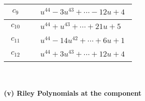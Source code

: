 \documentclass[1p]{elsarticle_modified}
\theoremstyle{definition}
\begin{document}
\begin{tabular}{m{50pt}|m{274pt}}
\hline $$\begin{aligned}c_{9}\end{aligned}$$&$\begin{aligned}
&u^{44}-3 u^{43}+\cdots-12 u+4
\end{aligned}$\\
\hline $$\begin{aligned}c_{10}\end{aligned}$$&$\begin{aligned}
&u^{44}+u^{43}+\cdots+21 u+5
\end{aligned}$\\
\hline $$\begin{aligned}c_{11}\end{aligned}$$&$\begin{aligned}
&u^{44}-14 u^{42}+\cdots+6 u+1
\end{aligned}$\\
\hline $$\begin{aligned}c_{12}\end{aligned}$$&$\begin{aligned}
&u^{44}+3 u^{43}+\cdots+12 u+4
\end{aligned}$\\
\hline
\end{tabular}\\~\\
\newpage\renewcommand{\arraystretch}{1}
\flushleft \textbf{(v) Riley Polynomials at the component}\newline \\
\end{document}
